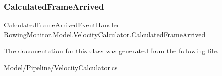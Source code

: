 \subsubsection{\texorpdfstring{Calculated\+Frame\+Arrived}{CalculatedFrameArrived}}
{\footnotesize\ttfamily \hyperlink{class_rowing_monitor_1_1_model_1_1_velocity_calculator_aba102b7d4623af9933bfe091c2ad1d9b}{Calculated\+Frame\+Arrived\+Event\+Handler} Rowing\+Monitor.\+Model.\+Velocity\+Calculator.\+Calculated\+Frame\+Arrived}



The documentation for this class was generated from the following file\+:\begin{DoxyCompactItemize}
\item 
Model/\+Pipeline/\hyperlink{_velocity_calculator_8cs}{Velocity\+Calculator.\+cs}\end{DoxyCompactItemize}
